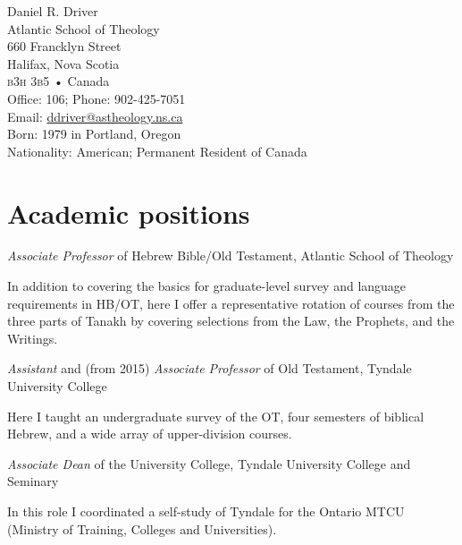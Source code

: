 \documentclass[10pt]{article}
\renewcommand\footnotesize{\fontsize{8}{11}\selectfont}
\renewcommand\Huge{\fontsize{22}{24}\selectfont}
\newcommand{\years}[1]{\marginnote{\footnotesize #1}}
\begin{document}
{\Huge Daniel R. Driver}\\[3em]
%
Atlantic School of Theology\\
660 Francklyn Street\\
Halifax, Nova Scotia\\
\textsc{b3h 3b5} • Canada\\[1em]

%
Office: 106; Phone: 902-425-7051\\
Email: \href{mailto:ddriver@astheology.ns.ca}{ddriver@astheology.ns.ca}\\[1em]
%
Born: 1979 in Portland, Oregon\\
Nationality: American; Permanent Resident of Canada
\vfill

\section*{Academic positions}
\years{2016---} \emph{Associate Professor} of Hebrew Bible/Old Testament, Atlantic School of Theology
	\begin{quoting}
	In addition to covering the basics for graduate-level survey and
	language requirements in HB/OT, here I offer a representative
	rotation of courses from the three parts of Tanakh by covering
	selections from the Law, the Prophets, and the Writings.
	\end{quoting}


\years{2008--2016} \emph{Assistant} and (from 2015) \emph{Associate Professor} of Old Testament, Tyndale University College
	\begin{quoting}
	Here I taught an undergraduate survey of the OT,
	four semesters of biblical Hebrew, and
	a wide array of upper-division courses.
	\end{quoting}

\years{2011--2013}
\emph{Associate Dean} of the University College, Tyndale University College and Seminary
	\begin{quoting}
	In this role I coordinated a self-study of Tyndale for the Ontario MTCU (Ministry of Training, Colleges and Universities).
	\end{quoting}
\end{document}
